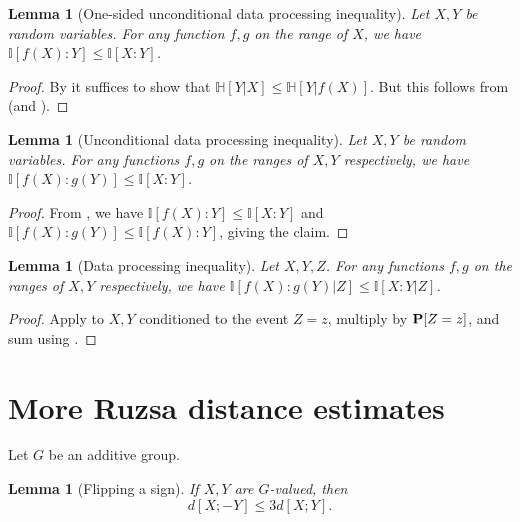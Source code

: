 \documentclass[10pt,a4paper]{article}
\newtheorem{lemma}[theorem]{Lemma}
\newcommand{\lean}[1]{}
\newcommand{\uses}[1]{}
\newcommand{\leanok}{}
\newcommand{\bbH}{\mathbb{H}}
\newcommand{\bbI}{\mathbb{I}}
\begin{document}
\begin{lemma}[One-sided unconditional data processing inequality]\label{data-process-unc-one}\lean{ProbabilityTheory.mutual_comp_le}\leanok Let $X,Y$ be random variables. For any function $f, g$ on the range of $X$, we have $\bbI[f(X) : Y] \leq \bbI[X:Y]$.
\end{lemma}

\begin{proof}\uses{alternative-mutual, submodularity, relabeled-entropy}\leanok
  By  it suffices to show that $\bbH[Y|X] \leq \bbH[Y|f(X)]$. But this follows from  (and ).
\end{proof}

\begin{lemma}[Unconditional data processing inequality]\label{data-process-unc}\lean{ProbabilityTheory.mutual_comp_comp_le}\leanok Let $X,Y$ be random variables. For any functions $f, g$ on the ranges of $X, Y$ respectively, we have $\bbI[f(X) : g(Y )] \leq \bbI[X : Y]$.
\end{lemma}

\begin{proof}\uses{data-process-unc-one, entropy-comm}\leanok
   From ,  we have $\bbI[f(X) : Y] \leq \bbI[X:Y]$ and $\bbI[f(X): g(Y)] \leq \bbI[f(X):Y]$, giving the claim.
\end{proof}

\begin{lemma}[Data processing inequality]\label{data-process}\lean{ProbabilityTheory.condMutual_comp_comp_le}\leanok Let $X,Y,Z$. For any functions $f, g$
on the ranges of $X, Y$ respectively, we have $\bbI[f(X) : g(Y )|Z] \leq \bbI[X :Y |Z]$.
\end{lemma}

\begin{proof}\uses{data-process-unc, conditional-mutual-def}\leanok  Apply  to $X,Y$ conditioned to the event $Z=z$, multiply by ${\bf P}[Z=z]$, and sum using .
\end{proof}

\section{More Ruzsa distance estimates}

Let $G$ be an additive group.

\begin{lemma}[Flipping a sign]\label{sign-flip}\lean{rdist_of_neg_le}\leanok
  If $X,Y$ are $G$-valued, then
  $$  d[X ; -Y]  \leq 3 d[X;Y].$$
\end{lemma}
\end{document}
